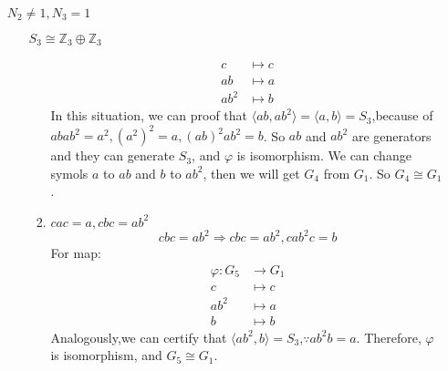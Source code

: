 \documentclass[a4paper,14pt]{article}
\begin{document}
\begin{enumerate}
\begin{item}{$N_2 \neq 1, N_3 = 1$}
\begin{enumerate}
\begin{item}{$S_3\cong \mathbb{Z}_3 \oplus \mathbb{Z}_3$}
\begin{enumerate}
\begin{align*}
                                c &\longmapsto c\\
                                ab &\longmapsto a\\
                                ab^2 &\longmapsto b
                            \end{align*}
                            In this situation, we can proof that $\langle ab,ab^2 \rangle = \langle a,b \rangle = S_3$,because of
                            $abab^2=a^2,(a^2)^2=a,(ab)^2ab^2=b$. So $ab$ and $ab^2$ are generators and they can generate $S_3$, and $\varphi$ is isomorphism.
                            We can change symols $a$ to $ab$ and $b$ to $ab^2$, then we will get $G_4$ from $G_1$. So $G_4 \cong G_1$.
                        \item $cac=a,cbc=ab^2$
                            $$cbc=ab^2 \Rightarrow cbc=ab^2,cab^2c=b$$
                            For map:
                            \begin{align*}
                                \varphi:G_5 &\to G_1\\
                                c &\longmapsto c\\
                                ab^2 &\longmapsto a\\
                                b &\longmapsto b
                            \end{align*}
                            Analogously,we can certify that $\langle ab^2,b \rangle = S_3$,$\because ab^2b=a$. Therefore, $\varphi$ is isomorphism, and $G_5 \cong G_1$.  
                     \end{enumerate}
                \end{item}
            \end{enumerate}
        \end{item}
    \end{enumerate}
\end{document}
